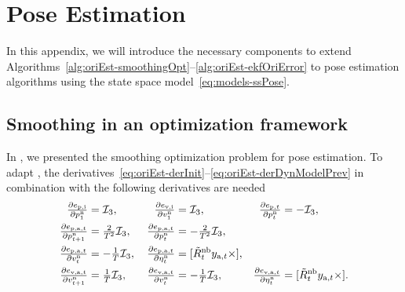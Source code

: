 \chapter{Pose Estimation}
\label{app:poseEst}
In this appendix, we will introduce the necessary components to extend Algorithms~\ref{alg:oriEst-smoothingOpt}--\ref{alg:oriEst-ekfOriError} to pose estimation algorithms using the state space model~\eqref{eq:models-ssPose}.
\section{Smoothing in an optimization framework}
In , we presented the smoothing optimization problem for pose estimation. To adapt , the derivatives~\eqref{eq:oriEst-derInit}--\eqref{eq:oriEst-derDynModelPrev} in combination with the following derivatives are needed
\begin{subequations}
\label{eq:oriEst-derPose}
\begin{align}
\tfrac{\partial e_{\text{p,i}} }{\partial p_1^\text{n}}&= \mathcal{I}_3, \, &
\tfrac{\partial e_{\text{v,i}} }{\partial v_1^\text{n}}&= \mathcal{I}_3, \, &
\tfrac{\partial e_{\text{p},t} }{\partial p_t^\text{n}}&= -\mathcal{I}_3,
\label{eq:app-poseEst-smoothingDerPosVelInitPos} \\
\tfrac{\partial e_{\text{p,a},t} }{\partial p_{t+1}^\text{n}}&= \tfrac{2}{T^2}\mathcal{I}_3,  \, &
\tfrac{\partial e_{\text{p,a},t} }{\partial p_t^\text{n}}&= - \tfrac{2}{T^2} \mathcal{I}_3, && \nonumber \\
\tfrac{\partial e_{\text{p,a},t} }{\partial v_t^\text{n}}&= - \tfrac{1}{T} \mathcal{I}_3, \, &
\tfrac{\partial e_{\text{p,a},t} }{\partial \eta_t^\text{n}}&= [ \tilde{R}^\text{nb}_t y_{\text{a},t} \times], && \label{eq:app-poseEst-smoothingDerPos} \\
\tfrac{\partial e_{\text{v,a},t} }{\partial v_{t+1}^\text{n}}&= \tfrac{1}{T}\mathcal{I}_3, \, &
\tfrac{\partial e_{\text{v,a},t} }{\partial v_t^\text{n}}&= - \tfrac{1}{T} \mathcal{I}_3, \, &
\tfrac{\partial e_{\text{v,a},t} }{\partial \eta_t^\text{n}}&= [ \tilde{R}^\text{nb}_t y_{\text{a},t} \times]. \label{eq:app-poseEst-smoothingDerVel} 
\end{align}
\end{subequations}

